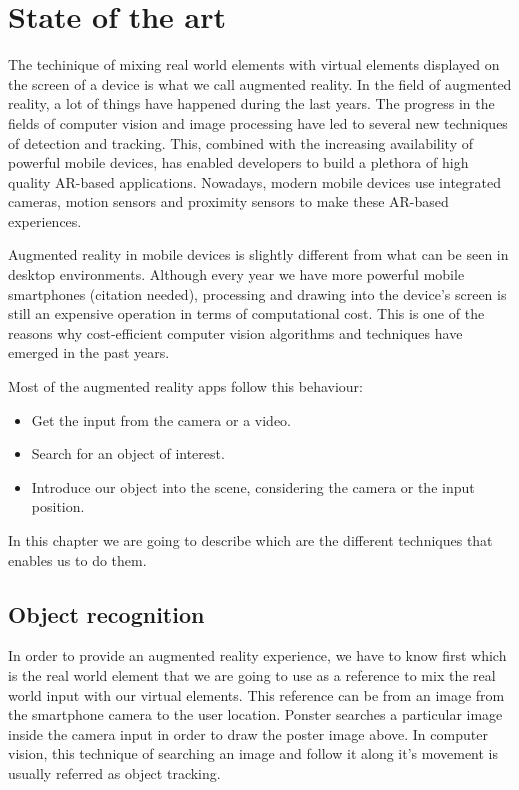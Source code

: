 \chapter{State of the art}
\label{chap:sota}
The techinique of
mixing real world elements with virtual elements displayed on the screen of a
device is what we call augmented reality. In the field of augmented reality, a
lot of things have happened during the last years. The progress in the fields
of computer vision and image processing have led to several new techniques of
detection and tracking. This, combined with the increasing availability of
powerful mobile devices, has enabled developers to build a plethora of high
quality AR-based applications. Nowadays, modern mobile devices use integrated
cameras, motion sensors and proximity sensors to make these AR-based experiences. 

Augmented reality in mobile devices is slightly different from what can be seen in
desktop environments. Although every year we have more powerful mobile smartphones
(citation needed), processing and drawing into the device's screen is still an
expensive operation in terms of computational cost. This is one of the reasons why
cost-efficient computer vision algorithms and techniques have emerged in the past
years. 

Most of the augmented reality apps follow this behaviour:
\begin{itemize}
\item Get the input from the camera or a video.
\item Search for an object of interest.
\item Introduce our object into the scene, considering the camera or the input position.
\end{itemize}

In this chapter we are going to describe which are the different techniques
that enables us to do them. 



\section{Object recognition}
In order to provide an augmented reality experience, we have to know first
which is the real world element that we are going to use as a reference to mix
the real world input with our virtual elements. This reference can be from an
image from the smartphone camera to the user location. Ponster searches a
particular image inside the camera input in order to draw the poster image above. In
computer vision, this technique of searching an image and follow it along it's
movement is usually referred as object tracking. 

